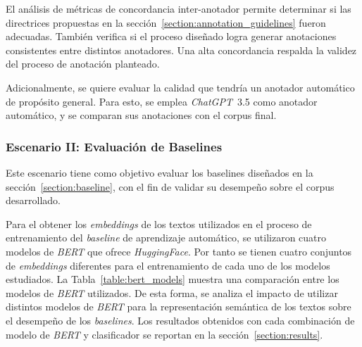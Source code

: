 El an\'alisis de m\'etricas de concordancia inter-anotador permite determinar si las directrices propuestas en la 
secci\'on~\ref{section:annotation_guidelines} fueron adecuadas. Tambi\'en verifica si el proceso dise\~nado logra generar
anotaciones consistentes entre distintos anotadores. Una alta concordancia respalda la validez del proceso de anotaci\'on
planteado.

Adicionalmente, se quiere evaluar la calidad que tendr\'ia un anotador autom\'atico de prop\'osito general. Para esto, se 
emplea \emph{ChatGPT}~3.5 como anotador autom\'atico, y se comparan sus anotaciones con el corpus final.

\subsubsection{Escenario II: Evaluaci\'on de Baselines}
Este escenario tiene como objetivo evaluar los baselines dise\~nados en la secci\'on~\ref{section:baseline}, con el fin de 
validar su desempe\~no sobre el corpus desarrollado.

Para el obtener los \emph{embeddings} de los textos utilizados en el proceso de entrenamiento del \emph{baseline} 
de aprendizaje autom\'atico, se utilizaron cuatro modelos de \emph{BERT} que ofrece \emph{HuggingFace}.
Por tanto se tienen cuatro conjuntos de \emph{embeddings} diferentes para el entrenamiento de cada uno de 
los modelos estudiados. La Tabla~\ref{table:bert_models} muestra una comparaci\'on entre los modelos de \emph{BERT} utilizados.
De esta forma, se analiza el impacto de utilizar distintos modelos de \emph{BERT} para la representaci\'on 
sem\'antica de los textos sobre el desempe\~no de los \emph{baselines}. Los resultados obtenidos con cada 
combinaci\'on de modelo de \emph{BERT} y clasificador se reportan en la secci\'on~\ref{section:results}.

\begin{table}[htpb]
    \centering
    \caption{Comparativa de modelos de \emph{BERT} utilizados.}
    \label{table:bert_models}
\end{table}


